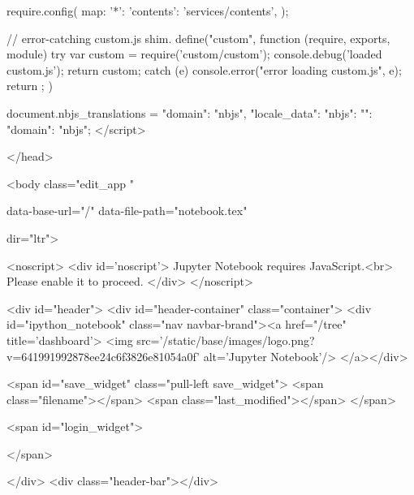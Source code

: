       require.config({
          map: {
              '*':{
                'contents': 'services/contents',
              }
          }
      });

      // error-catching custom.js shim.
      define("custom", function (require, exports, module) {
          try {
              var custom = require('custom/custom');
              console.debug('loaded custom.js');
              return custom;
          } catch (e) {
              console.error("error loading custom.js", e);
              return {};
          }
      })

    document.nbjs_translations = {"domain": "nbjs", "locale_data": {"nbjs": {"": {"domain": "nbjs"}}}};
    </script>

    
    

</head>

<body class="edit_app "
 
data-base-url="/"
data-file-path="notebook.tex"

  
 

dir="ltr">

<noscript>
    <div id='noscript'>
      Jupyter Notebook requires JavaScript.<br>
      Please enable it to proceed. 
  </div>
</noscript>

<div id="header">
  <div id="header-container" class="container">
  <div id="ipython_notebook" class="nav navbar-brand"><a href="/tree" title='dashboard'>
      <img src='/static/base/images/logo.png?v=641991992878ee24c6f3826e81054a0f' alt='Jupyter Notebook'/>
  </a></div>

  

<span id="save_widget" class="pull-left save_widget">
    <span class="filename"></span>
    <span class="last_modified"></span>
</span>


  
  
  
  

    <span id="login_widget">
      
    </span>

  

  
  
  </div>
  <div class="header-bar"></div>

  

